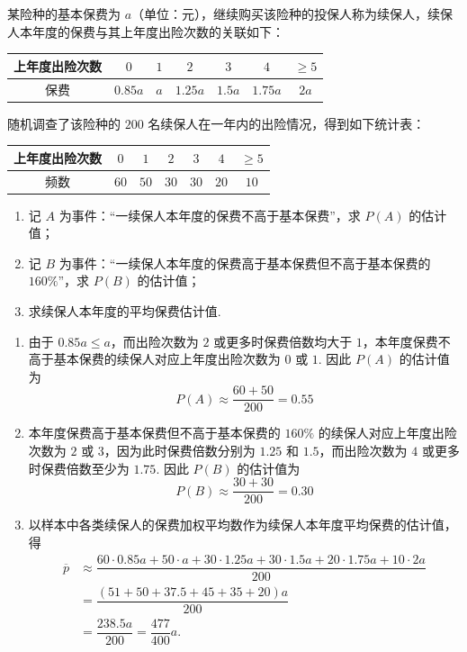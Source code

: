 \begin{problem}
某险种的基本保费为 \(a\)（单位：元），继续购买该险种的投保人称为续保人，续保人本年度的保费与其上年度出险次数的关联如下：

\begin{center}
\begin{tabular}{c|cccccc}
上年度出险次数 & \(0\) & \(1\) & \(2\) & \(3\) & \(4\) & \(\geq 5\)\\
\hline
保费 & \(0.85a\) & \(a\) & \(1.25a\) & \(1.5a\) & \(1.75a\) & \(2a\)
\end{tabular}
\end{center}

随机调查了该险种的 \(200\) 名续保人在一年内的出险情况，得到如下统计表：

\begin{center}
\begin{tabular}{c|cccccc}
上年度出险次数 & \(0\) & \(1\) & \(2\) & \(3\) & \(4\) & \(\geq 5\)\\
\hline
频数 & \(60\) & \(50\) & \(30\) & \(30\) & \(20\) & \(10\)
\end{tabular}
\end{center}

\begin{enumerate}
\item 记 \(A\) 为事件：“一续保人本年度的保费不高于基本保费”，求 \(P(A)\) 的估计值；
\item 记 \(B\) 为事件：“一续保人本年度的保费高于基本保费但不高于基本保费的 \(160\%\)”，求 \(P(B)\) 的估计值；
\item 求续保人本年度的平均保费估计值.
\end{enumerate}
\end{problem}

\begin{solution}
\begin{enumerate}
\item 由于 \(0.85a\leq a\)，而出险次数为 \(2\) 或更多时保费倍数均大于 \(1\)，本年度保费不高于基本保费的续保人对应上年度出险次数为 \(0\) 或 \(1\). 因此 \(P(A)\) 的估计值为
\[
P(A)\approx\dfrac{60+50}{200}=0.55
\]

\item 本年度保费高于基本保费但不高于基本保费的 \(160\%\) 的续保人对应上年度出险次数为 \(2\) 或 \(3\)，因为此时保费倍数分别为 \(1.25\) 和 \(1.5\)，而出险次数为 \(4\) 或更多时保费倍数至少为 \(1.75\). 因此 \(P(B)\) 的估计值为
\[
P(B)\approx\dfrac{30+30}{200}=0.30
\]

\item 以样本中各类续保人的保费加权平均数作为续保人本年度平均保费的估计值，得
\[
\begin{aligned}
\overline p&\approx\dfrac{60\cdot0.85a+50\cdot a+30\cdot1.25a+30\cdot1.5a+20\cdot1.75a+10\cdot2a}{200}\\
&=\dfrac{(51+50+37.5+45+35+20)a}{200}\\
&=\dfrac{238.5a}{200}=\dfrac{477}{400}a.
\end{aligned}
\]
\end{enumerate}
\end{solution}


